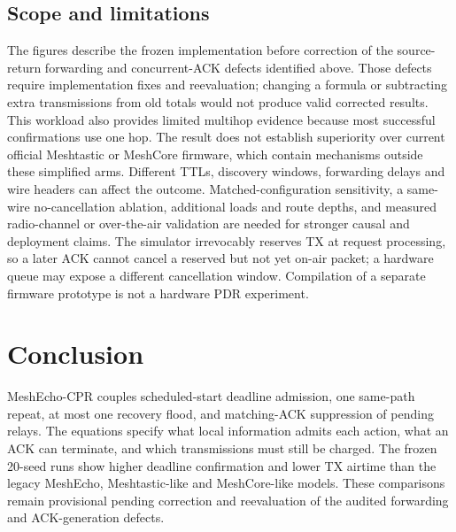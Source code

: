 \documentclass[conference,letterpaper,10pt]{IEEEtran}
\begin{document}
\subsection{Scope and limitations}
The figures describe the frozen implementation before correction of the
source-return forwarding and concurrent-ACK defects identified above.
Those defects require implementation fixes and reevaluation; changing a
formula or subtracting extra transmissions from old totals would not produce
valid corrected results. This workload also provides limited multihop
evidence because most successful confirmations use one hop.
The result does not establish superiority over current official Meshtastic
or MeshCore firmware, which contain mechanisms outside these simplified
arms. Different TTLs, discovery windows, forwarding delays and wire headers
can affect the outcome. Matched-configuration sensitivity, a same-wire
no-cancellation ablation, additional loads and route depths, and measured
radio-channel or over-the-air validation are needed for stronger causal
and deployment claims. The simulator irrevocably reserves TX at request
processing, so a later ACK cannot cancel a reserved but not yet on-air
packet; a hardware queue may expose a different cancellation window.
Compilation of a separate firmware prototype is
not a hardware PDR experiment.

\section{Conclusion}
MeshEcho-CPR couples scheduled-start deadline admission, one same-path repeat,
at most one recovery flood, and matching-ACK suppression of pending relays.
The equations specify what local information admits each action, what an ACK
can terminate, and which transmissions must still be charged.
The frozen 20-seed runs show higher deadline confirmation and lower TX
airtime than the legacy MeshEcho, Meshtastic-like and MeshCore-like models.
These comparisons remain provisional pending correction and reevaluation
of the audited forwarding and ACK-generation defects.
\end{document}
